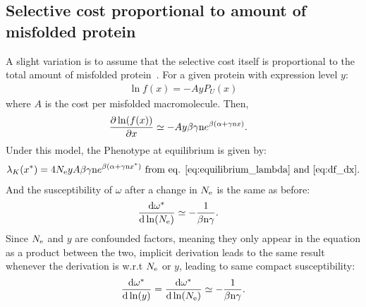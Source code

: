 \subsection{Selective cost proportional to amount of misfolded protein}
A slight variation is to assume that the selective cost itself is proportional to the total amount of misfolded protein~\citep{Drummond2005a, Wilke2006, Drummond2008, Serohijos2012}. For a given protein with expression level $y$:
\begin{align}
\ln f(x) = - A y P_{U} (x)
\end{align}
where $A$ is the cost per misfolded macromolecule. Then, 
\begin{align}
\frac{\partial \ln (f(x))}{\partial x} & \simeq -A y \beta \gamma \text{n} e^{\beta(\alpha + \gamma \text{n} x)}.
\end{align}
Under this model, the \gls{Phenotype} at equilibrium is given by:
\begin{align}
\lambda_{K}(x^{*}) = 4N_{\mathrm{e}} y A \beta \gamma \text{n} e^{\beta(\alpha + \gamma \text{n} x^{*})} \text{ from eq. \ref{eq:equilibrium_lambda} and \ref{eq:df_dx}}.
\end{align}
And the susceptibility of $\omega$ after a change in $N_{\mathrm{e}}$ is the same as before:
\begin{align}
\frac{ \mathrm{d} \omega^{*}}{\mathrm{d} \ln (N_{\mathrm{e}})} & \simeq - \frac{1}{\beta \text{n} \gamma}.
\end{align}
Since $N_{\mathrm{e}}$ and $y$ are confounded factors, meaning they only appear in the equation as a product between the two, implicit derivation leads to the same result whenever the derivation is w.r.t $N_{\mathrm{e}}$ or $y$, leading to same compact susceptibility:
\begin{align}
\frac{ \mathrm{d} \omega^{*}}{\mathrm{d} \ln (y)} = \frac{ \mathrm{d} \omega^{*}}{\mathrm{d} \ln (N_{\mathrm{e}})} \simeq - \frac{1}{\beta \text{n} \gamma}.
\end{align}

